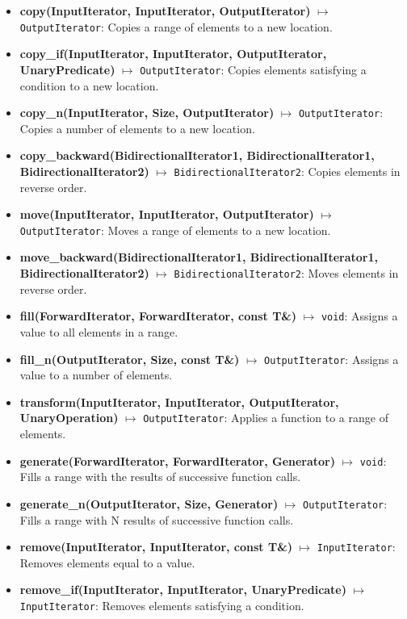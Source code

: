 \documentclass{report}
\begin{document}
    \bigbreak \noindent 
    \begin{itemize}
        \item \textbf{copy(InputIterator, InputIterator, OutputIterator)} \(\mapsto\) \texttt{OutputIterator}: Copies a range of elements to a new location.
        \item \textbf{copy\_if(InputIterator, InputIterator, OutputIterator, UnaryPredicate)} \(\mapsto\) \texttt{OutputIterator}: Copies elements satisfying a condition to a new location.
        \item \textbf{copy\_n(InputIterator, Size, OutputIterator)} \(\mapsto\) \texttt{OutputIterator}: Copies a number of elements to a new location.
        \item \textbf{copy\_backward(BidirectionalIterator1, BidirectionalIterator1, BidirectionalIterator2)} \(\mapsto\) \texttt{BidirectionalIterator2}: Copies elements in reverse order.
        \item \textbf{move(InputIterator, InputIterator, OutputIterator)} \(\mapsto\) \texttt{OutputIterator}: Moves a range of elements to a new location.
        \item \textbf{move\_backward(BidirectionalIterator1, BidirectionalIterator1, BidirectionalIterator2)} \(\mapsto\) \texttt{BidirectionalIterator2}: Moves elements in reverse order.
        \item \textbf{fill(ForwardIterator, ForwardIterator, const T\&)} \(\mapsto\) \texttt{void}: Assigns a value to all elements in a range.
        \item \textbf{fill\_n(OutputIterator, Size, const T\&)} \(\mapsto\) \texttt{OutputIterator}: Assigns a value to a number of elements.
        \item \textbf{transform(InputIterator, InputIterator, OutputIterator, UnaryOperation)} \(\mapsto\) \texttt{OutputIterator}: Applies a function to a range of elements.
        \item \textbf{generate(ForwardIterator, ForwardIterator, Generator)} \(\mapsto\) \texttt{void}: Fills a range with the results of successive function calls.
        \item \textbf{generate\_n(OutputIterator, Size, Generator)} \(\mapsto\) \texttt{OutputIterator}: Fills a range with N results of successive function calls.
        \item \textbf{remove(InputIterator, InputIterator, const T\&)} \(\mapsto\) \texttt{InputIterator}: Removes elements equal to a value.
        \item \textbf{remove\_if(InputIterator, InputIterator, UnaryPredicate)} \(\mapsto\) \texttt{InputIterator}: Removes elements satisfying a condition.

\end{itemize}
\end{document}
